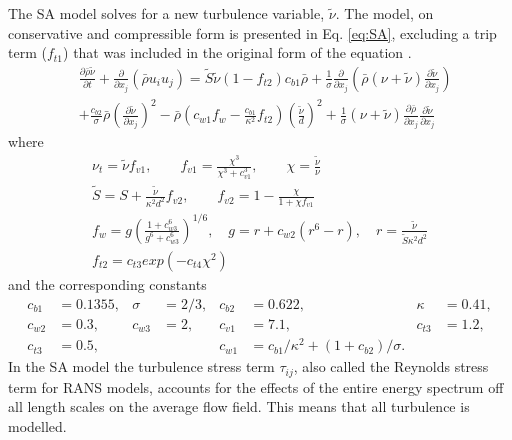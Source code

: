 The SA model solves for a new turbulence variable, $\tilde{\nu}$. The model, on conservative and compressible form is presented in Eq. \ref{eq:SA}, excluding a trip term ($f_{t1}$) that was included in the original form of the equation \cite{SA,SAmod}.
\begin{equation}
\begin{aligned}
  &\frac{\partial\bar{\rho}\tilde{\nu}}{\partial t}+\frac{\partial}{\partial x_j}\left(\bar{\rho}{u}_i{u}_j\right) = \tilde{S}\tilde{\nu}\left(1-f_{t2}\right)c_{b1}\bar{\rho}+\frac{1}{\sigma}\frac{\partial}{\partial x_j}\left(\bar{\rho} \left(\nu+\tilde{\nu}\right)\frac{\partial \tilde{\nu}}{\partial x_j}\right)\\
  &+\frac{c_{b2}}{\sigma}\bar{\rho}\left(\frac{\partial \tilde{\nu}}{\partial x_j}\right)^2-\bar{\rho}\left(c_{w1}f_w-\frac{c_{b1}}{\kappa ^2}f_{t2}\right)\left(\frac{\tilde{\nu}}{d}\right)^2+\frac{1}{\sigma}\left(\nu+\tilde{\nu}\right)\frac{\partial \bar{\rho}}{\partial x_j}\frac{\partial \tilde{\nu}}{\partial x_j}\label{eq:SA}
\end{aligned}
\end{equation}
where  
\begin{equation}
  \begin{gathered}
    \nu_t = \tilde{\nu}f_{v1}, \qquad f_{v1}=\frac{\chi^3}{\chi^3+c_{v1}^3},\qquad \chi = \frac{\tilde{\nu}}{\nu}\\
  \tilde{S} = S + \frac{\tilde{\nu}}{\kappa ^2 d ^2}f_{v2}, \qquad f_{v2}=1-\frac{\chi}{1+\chi f_{v1}}\\
  f_w=g\left(\frac{1+c_{w3}^6}{g^6+c_{w3}^6}\right)^{1/6},\quad g=r+c_{w2}\left(r^6-r\right), \quad r=\frac{\tilde{\nu}}{\tilde{S}\kappa^2d^2}\\
    f_{t2} = c_{t3}exp\left(-c_{t4}\chi^2\right)\label{eq:SAf}
  \end{gathered}
  \end{equation}
and the corresponding constants 
\begin{equation}
  \begin{aligned}
    c_{b1}&=0.1355, & \sigma&=2/3, &  c_{b2}&=0.622,                                          &  \kappa&=0.41, \\
    c_{w2}&=0.3,    & c_{w3}&=2,   &  c_{v1}&=7.1,                                            &  c_{t3}&=1.2, \\
    c_{t3}&=0.5,    &       &      &  c_{w1}&=c_{b1}/\kappa^2+\left(1+c_{b2}\right)/\sigma.   &        &
  \end{aligned}
\end{equation}
In the SA model the turbulence stress term $\tau _{ij}$, also called the Reynolds stress term for RANS models, accounts for the effects of the entire energy spectrum off all length scales on the average flow field. This means that all turbulence is modelled. 

